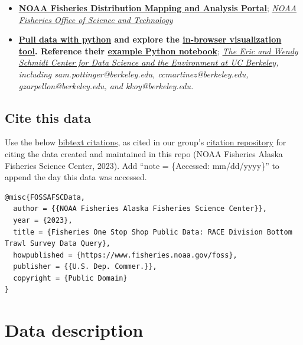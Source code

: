 \documentclass[
  letterpaper,
  oneside,
  open=any]{scrbook}
\begin{document}
\begin{itemize}
\item
  \textbf{\href{https://apps-st.fisheries.noaa.gov/dismap}{NOAA
  Fisheries Distribution Mapping and Analysis Portal}};
  \emph{\href{https://www.fisheries.noaa.gov/contact/office-science-and-technology}{NOAA
  Fisheries Office of Science and Technology}}
\item
  \textbf{\href{https://pyafscgap.org/}{Pull data with python} and
  explore the
  \href{https://app.pyafscgap.org/\textquotesingle{}}{in-browser
  visualization tool}. Reference their
  \href{https://mybinder.org/v2/gh/SchmidtDSE/afscgap/main?urlpath=/tree/index.ipynb}{example
  Python notebook}}; \emph{\href{https://dse.berkeley.edu/}{The Eric and
  Wendy Schmidt Center for Data Science and the Environment at UC
  Berkeley}, including sam.pottinger@berkeley.edu,
  ccmartinez@berkeley.edu, gzarpellon@berkeley.edu, and
  kkoy@berkeley.edu.}
\end{itemize}

\hypertarget{cite-this-data-3}{%
\section*{Cite this data}\label{cite-this-data-3}}


Use the below
\href{https://github.com/afsc-gap-products/gap_products/blob/main/code/CITATION_FOSSAFSCData.bib}{bibtext
citations}, as cited in our group's
\href{https://github.com/afsc-gap-products/citations/blob/main/cite/bibliography.bib}{citation
repository} for citing the data created and maintained in this repo
(NOAA Fisheries Alaska Fisheries Science Center, 2023). Add ``note =
\{Accessed: mm/dd/yyyy\}'' to append the day this data was accessed.

\begin{verbatim}
@misc{FOSSAFSCData,
  author = {{NOAA Fisheries Alaska Fisheries Science Center}},
  year = {2023}, 
  title = {Fisheries One Stop Shop Public Data: RACE Division Bottom Trawl Survey Data Query},
  howpublished = {https://www.fisheries.noaa.gov/foss},
  publisher = {{U.S. Dep. Commer.}},
  copyright = {Public Domain} 
}
\end{verbatim}

\hypertarget{data-description-2}{%
\chapter{Data description}\label{data-description-2}}
\end{document}
